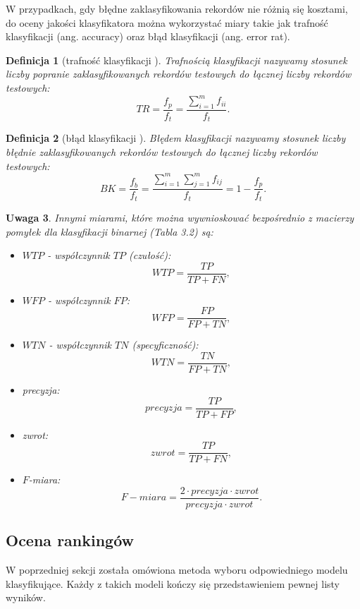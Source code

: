 \documentclass[12pt,a4paper]{report}
\newtheorem{df}{Definicja}[chapter]
\newtheorem{uwaga}[df]{Uwaga}
\begin{document}
W przypadkach, gdy błędne zaklasyfikowania rekordów nie różnią się kosztami, do oceny jakości klasyfikatora można wykorzystać miary takie jak trafność klasyfikacji (ang. accuracy) oraz błąd klasyfikacji (ang. error rat).
\begin{df}[trafność klasyfikacji {\citep[Sec 4.8.1]{edmia}}]
Trafnością klasyfikacji nazywamy stosunek liczby popranie zaklasyfikowanych rekordów testowych do łącznej liczby rekordów testowych:
$$
TR= \frac{f_p}{f_t} = \frac{\sum_{i=1}^m f_{ii}}{f_t}.
$$
\end{df}
\begin{df}[błąd klasyfikacji {\citep[Sec 4.8.1]{edmia}}]
Błędem klasyfikacji nazywamy stosunek liczby błędnie zaklasyfikowanych rekordów testowych do łącznej liczby rekordów testowych:
$$
BK = \frac{f_b}{f_t}=\frac{\sum_{i=1}^m \sum_{j=1}^m f_{ij}}{f_t}=1 - \frac{f_p}{f_t}.
$$
\end{df}
\begin{uwaga}{\citep[Sec 4.8.1]{edmia}}
Innymi miarami, które można wywnioskować bezpośrednio z macierzy pomyłek dla klasyfikacji binarnej (Tabla 3.2) są:
\begin{itemize}
\item $WTP$ - współczynnik $TP$ (czułość):
$$
WTP = \frac{TP}{TP + FN},
$$
\item $WFP$ - współczynnik $FP$:
$$
WFP = \frac{FP}{FP + TN},
$$
\item $WTN$ - współczynnik $TN$ (specyficzność):
$$
WTN = \frac{TN}{FP + TN},
$$
\item precyzja:
$$
precyzja = \frac{TP}{TP + FP},
$$
\item zwrot:
$$
zwrot = \frac{TP}{TP + FN},
$$
\item $F$-miara:
$$
F - miara = \frac{2 \cdot precyzja \cdot zwrot}{precyzja \cdot zwrot}.
$$
\end{itemize}
\end{uwaga}

\subsection{Ocena rankingów}
W poprzedniej sekcji została omówiona metoda wyboru odpowiedniego modelu klasyfikujące. Każdy z takich modeli kończy się przedstawieniem pewnej listy wyników. 
\end{document}
